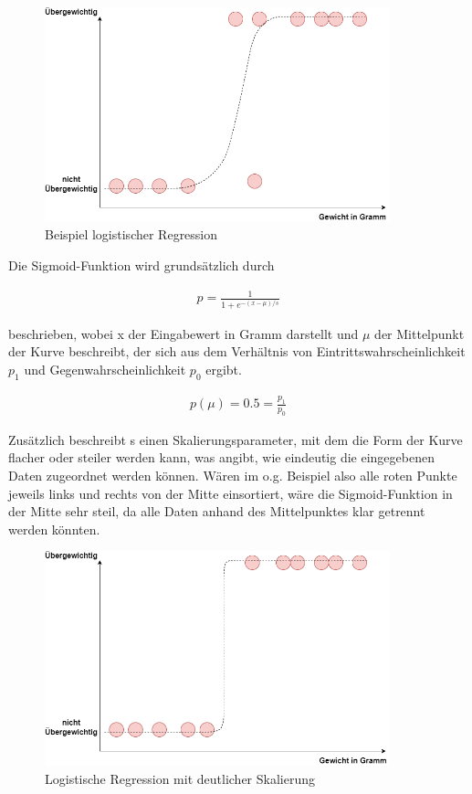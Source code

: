 \begin{figure}[h]
    \centering
    \includegraphics[width=10.0cm]{pic/logistic_regression.png}
    \caption{Beispiel logistischer Regression}
    \label{fig:LR}
\end{figure}

Die Sigmoid-Funktion wird grundsätzlich durch

\begin{align}
    p = \frac{1}{1 + e^{-(x-\mu)/s}}
\end{align}

beschrieben, wobei x der Eingabewert in Gramm darstellt und $\mu$ der Mittelpunkt der Kurve beschreibt, der sich aus dem 
Verhältnis von Eintrittswahrscheinlichkeit $p_1$ und Gegenwahrscheinlichkeit $p_0$ ergibt.

\begin{align}
    p(\mu) = 0.5 = \frac{p_1}{p_0}   
\end{align}

\newpage
Zusätzlich beschreibt s einen Skalierungsparameter, mit dem die Form der Kurve flacher oder steiler werden kann,
was angibt, wie eindeutig die eingegebenen Daten zugeordnet werden können. Wären im o.g. Beispiel also alle roten
Punkte jeweils links und rechts von der Mitte einsortiert, wäre die Sigmoid-Funktion in der Mitte sehr steil, da alle
Daten anhand des Mittelpunktes klar getrennt werden könnten.

\begin{figure}[h]
    \centering
    \includegraphics[width=10.0cm]{pic/logistic_regression_high s.png}
    \caption{Logistische Regression mit deutlicher Skalierung}
    \label{fig:LR_scal}
\end{figure}

